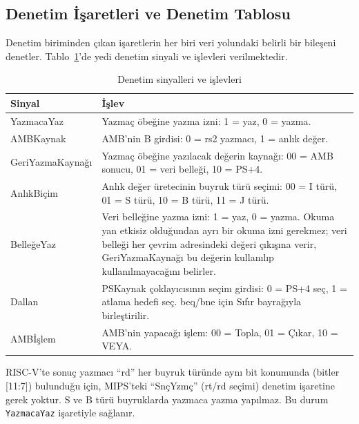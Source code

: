 \subsection{Denetim İşaretleri ve Denetim Tablosu}
\label{subsec:denetim-isaretleri}\label{subsec:denetim-tablosu}

Denetim biriminden çıkan işaretlerin her biri veri yolundaki belirli bir bileşeni denetler. Tablo~\ref{tab:denetim-birimleri}'de yedi denetim sinyali ve işlevleri verilmektedir.

\begin{table}[htbp]
\centering
\caption{Denetim sinyalleri ve işlevleri}
\label{tab:denetim-birimleri}
\begin{tabular}{lp{10cm}}
\toprule
\textbf{Sinyal} & \textbf{İşlev} \\
\midrule
YazmacaYaz & Yazmaç öbeğine yazma izni: 1 = yaz, 0 = yazma. \\
AMBKaynak & AMB'nin B girdisi: 0 = rs2 yazmacı, 1 = anlık değer. \\
GeriYazmaKaynağı & Yazmaç öbeğine yazılacak değerin kaynağı: 00 = AMB sonucu, 01 = veri belleği, 10 = PS+4. \\
AnlıkBiçim & Anlık değer üretecinin buyruk türü seçimi: 00 = I türü, 01 = S türü, 10 = B türü, 11 = J türü. \\
BelleğeYaz & Veri belleğine yazma izni: 1 = yaz, 0 = yazma. Okuma yan etkisiz olduğundan ayrı bir okuma izni gerekmez; veri belleği her çevrim adresindeki değeri çıkışına verir, GeriYazmaKaynağı bu değerin kullanılıp kullanılmayacağını belirler. \\
Dallan & PSKaynak çoklayıcısının seçim girdisi: 0 = PS+4 seç, 1 = atlama hedefi seç. beq/bne için Sıfır bayrağıyla birleştirilir. \\
AMBİşlem & AMB'nin yapacağı işlem: 00 = Topla, 01 = Çıkar, 10 = VEYA. \\
\bottomrule
\end{tabular}
\end{table}

\begin{bilginot}
RISC-V'te sonuç yazmacı ``rd'' her buyruk türünde aynı bit konumunda (bitler [11:7]) bulunduğu için, MIPS'teki ``SnçYzmç'' (rt/rd seçimi) denetim işaretine gerek yoktur. S ve B türü buyruklarda yazmaca yazma yapılmaz. Bu durum \texttt{YazmacaYaz} işaretiyle sağlanır.
\end{bilginot}

